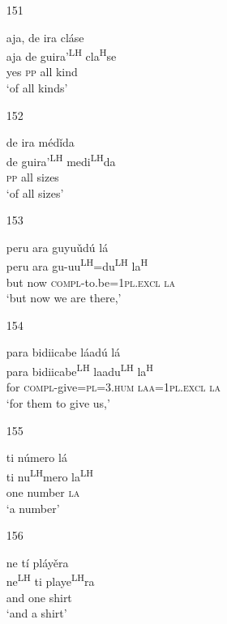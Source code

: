 \begin{itemize}
\item[151]
 
\glll   aja, de ira cl\'{a}se \\
 aja de guira'\textsuperscript{LH} cla\textsuperscript{H}se\\
yes \textsc{pp} all kind\\
\glt `of all kinds'
 



\item[152]
 
\glll   de ira m\'{e}d\v{i}da \\
 de guira'\textsuperscript{LH} medi\textsuperscript{LH}da\\
\textsc{pp} all sizes\\
\glt `of all sizes'
 



\item[153]
 
\glll   peru ara guyu\v{u}d\'{u} l\'{a} \\
peru ara gu-uu\textsuperscript{LH}=du\textsuperscript{LH} la\textsuperscript{H} \\
but now \textsc{compl}-to.be=\textsc{1pl.excl} \textsc{la}\\
\glt `but now we are there,'
 


\item[154]
 
\glll   para bidiicabe l\'{a}ad\'{u} l\'{a}\\
para bidiicabe\textsuperscript{LH} laadu\textsuperscript{LH} la\textsuperscript{H}\\
for \textsc{compl}-give=\textsc{pl}=\textsc{3.hum} \textsc{laa}=\textsc{1pl.excl} \textsc{la}\\
\glt `for them to give us,'
 



\item[155]
 
\glll   ti n\'{u}mero l\'{a} \\
ti nu\textsuperscript{LH}mero la\textsuperscript{LH}\\
one number \textsc{la}\\
\glt `a number'
 


\item[156]
 
\glll   ne t\'{i} pl\'{a}y\v{e}ra\\
ne\textsuperscript{LH} ti playe\textsuperscript{LH}ra\\
and one shirt\\
\glt `and a shirt'
 



\end{itemize}
